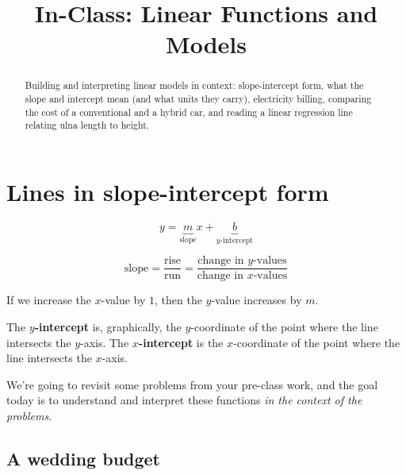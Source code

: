 \documentclass[12pt]{ximera}
\title{In-Class: Linear Functions and Models}
\begin{document}
\begin{abstract}
Building and interpreting linear models in context: slope-intercept form, what the
slope and intercept mean (and what units they carry), electricity billing, comparing
the cost of a conventional and a hybrid car, and reading a linear regression line
relating ulna length to height.
\end{abstract}
\maketitle

\section*{Lines in slope-intercept form}

\[
y = \underbrace{m}_{\text{slope}} x + \underbrace{b}_{y\text{-intercept}}
\]

\[
\text{slope} = \frac{\text{rise}}{\text{run}}
= \frac{\text{change in } y\text{-values}}{\text{change in } x\text{-values}}
\]

If we increase the $x$-value by $1$, then the $y$-value increases by $m$.

The \textbf{$y$-intercept} is, graphically, the $y$-coordinate of the point where the
line intersects the $y$-axis. The \textbf{$x$-intercept} is the $x$-coordinate of the
point where the line intersects the $x$-axis.

We're going to revisit some problems from your pre-class work, and the goal today is
to understand and interpret these functions \emph{in the context of the problems}.

\subsection*{A wedding budget}
\end{document}
